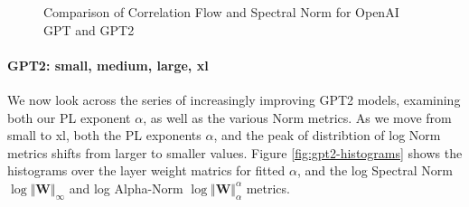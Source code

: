 \begin{figure}[t]
    \centering

    \qquad
    \qquad
    \caption{Comparison of Correlation Flow and Spectral Norm for OpenAI GPT and GPT2   }
    \label{fig:gpt-alpha-layers}
\end{figure}




\paragraph{GPT2: small, medium, large, xl} 

We now look across the series of increasingly improving GPT2 models, examining both our
PL exponent $\alpha$, as well as the various Norm metrics.
As we move from small to xl, both the PL exponents $\alpha$, and the peak of distribtion of
log Norm metrics shifts from larger to smaller values. 
Figure \ref{fig:gpt2-histograms} shows the histograms over the layer weight matrics
for fitted $\alpha$, and the log Spectral Norm
 $\log\Vert\mathbf{W}\Vert_{\infty}$  
and log Alpha-Norm
 $\log\Vert\mathbf{W}\Vert_{\alpha}^{\alpha}$ 
metrics.

